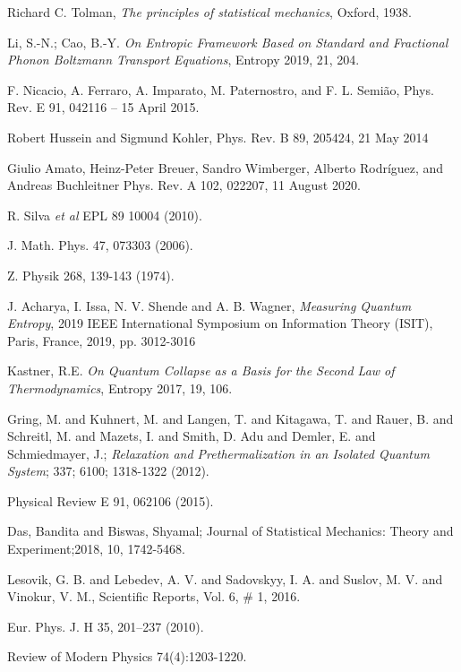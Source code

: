 \documentclass{article}
\begin{document}
\begin{thebibliography}{}
 Richard C. Tolman, \emph{The principles of statistical mechanics}, Oxford, 1938.

Li, S.-N.; Cao, B.-Y. {\it On Entropic Framework Based on Standard and Fractional Phonon Boltzmann Transport Equations}, Entropy 2019, 21, 204.


F. Nicacio, A. Ferraro, A. Imparato, M. Paternostro, and F. L. Semião,
Phys. Rev. E 91, 042116 – 15 April 2015.

Robert Hussein and Sigmund Kohler,
Phys. Rev. B 89, 205424, 21 May 2014

Giulio Amato, Heinz-Peter Breuer, Sandro Wimberger, Alberto Rodríguez, and Andreas Buchleitner
Phys. Rev. A 102, 022207, 11 August 2020.

R. Silva {\it et al} EPL 89 10004 (2010).

J. Math. Phys. 47, 073303 (2006).

Z. Physik 268, 139-143 (1974).

J. Acharya, I. Issa, N. V. Shende and A. B. Wagner, {\it Measuring Quantum Entropy}, 2019 IEEE International Symposium on Information Theory (ISIT), Paris, France, 2019, pp. 3012-3016

Kastner, R.E. {\it On Quantum Collapse as a Basis for the Second Law of Thermodynamics}, Entropy 2017, 19, 106.



Gring, M. and Kuhnert, M. and Langen, T. and Kitagawa, T. and Rauer, B. and Schreitl, M. and Mazets, I. and Smith, D. Adu and Demler, E. and Schmiedmayer, J.; {\it Relaxation and Prethermalization in an Isolated Quantum System}; 337; 6100; 1318-1322 (2012).

Physical Review E 91, 062106 (2015).




Das, Bandita and Biswas, Shyamal; Journal of Statistical Mechanics: Theory and Experiment;2018, 10, 1742-5468. 

Lesovik, G. B. and Lebedev, A. V. and Sadovskyy, I. A. and Suslov, M. V. and Vinokur, V. M., Scientific Reports, Vol. 6, \# 1, 2016.

Eur. Phys. J. H 35, 201–237 (2010).

Review of Modern Physics 74(4):1203-1220.




\end{thebibliography}{}
\clearpage
\end{document}
